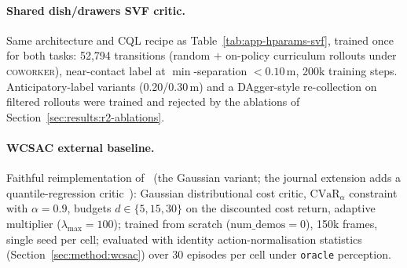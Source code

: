 \documentclass[11pt,a4paper]{report}
\newcommand{\cvar}{\ensuremath{\mathrm{CVaR}}}
\newcommand{\coworker}{\textsc{coworker}}
\begin{document}
\begin{table}[htbp]
\centering
\small
\caption{Recommended runtime deployment configuration per
co-location regime, as established by the results chapter: the
constrained policy carries safety under persistent co-location, the
critic-gated speed-scaler under intermittent co-location. The veto
and the model-based dodges are taxonomy points, not deployment
configurations.}
\label{tab:app-hparams-hybrid}
\end{table}

\paragraph{Shared dish/drawers SVF critic.}
Same architecture and CQL recipe as Table~\ref{tab:app-hparams-svf},
trained once for both tasks: 52{,}794 transitions
(random $+$ on-policy curriculum rollouts under \coworker{}),
near-contact label at $\min$-separation $< 0.10$\,m, 200k training
steps. Anticipatory-label variants (0.20/0.30\,m) and a
DAgger-style re-collection on filtered rollouts were trained and
rejected by the ablations of
Section~\ref{sec:results:r2-ablations}.

\paragraph{WCSAC external baseline.}
Faithful reimplementation of~\cite{yang2021wcsac} (the Gaussian
variant; the journal extension adds a quantile-regression
critic~\cite{yang2023wcsacjournal}): Gaussian
distributional cost critic, $\cvar{}_{\alpha}$ constraint with
$\alpha = 0.9$, budgets $d \in \{5, 15, 30\}$ on the discounted cost
return, adaptive multiplier ($\lambda_{\max} = 100$); trained from
scratch ($\text{num\_demos} = 0$), 150k frames, single seed per
cell; evaluated with identity action-normalisation statistics
(Section~\ref{sec:method:wcsac}) over 30 episodes per cell under
\texttt{oracle} perception.
\end{document}
